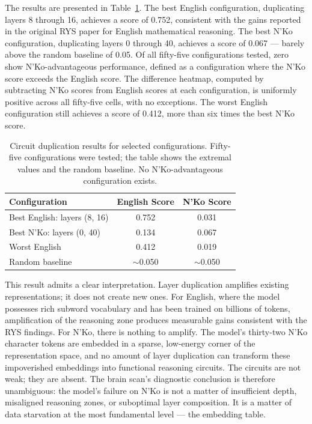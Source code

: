 \documentclass[11pt]{article}
\newcommand{\nko}{N'Ko}
\begin{document}
The results are presented in Table~\ref{tab:circuit_dup}. The best English configuration, duplicating layers 8 through 16, achieves a score of 0.752, consistent with the gains reported in the original RYS paper for English mathematical reasoning. The best \nko{} configuration, duplicating layers 0 through 40, achieves a score of 0.067 --- barely above the random baseline of 0.05. Of all fifty-five configurations tested, zero show \nko{}-advantageous performance, defined as a configuration where the \nko{} score exceeds the English score. The difference heatmap, computed by subtracting \nko{} scores from English scores at each configuration, is uniformly positive across all fifty-five cells, with no exceptions. The worst English configuration still achieves a score of 0.412, more than six times the best \nko{} score.

\begin{table}[ht]
\centering
\caption{Circuit duplication results for selected configurations. Fifty-five configurations were tested; the table shows the extremal values and the random baseline. No \nko{}-advantageous configuration exists.}
\label{tab:circuit_dup}
\begin{tabular}{@{}lcc@{}}
\toprule
Configuration & English Score & \nko{} Score \\
\midrule
Best English: layers (8, 16) & 0.752 & 0.031 \\
Best \nko{}: layers (0, 40) & 0.134 & 0.067 \\
Worst English & 0.412 & 0.019 \\
Random baseline & $\sim$0.050 & $\sim$0.050 \\
\bottomrule
\end{tabular}
\end{table}

This result admits a clear interpretation. Layer duplication amplifies existing representations; it does not create new ones. For English, where the model possesses rich subword vocabulary and has been trained on billions of tokens, amplification of the reasoning zone produces measurable gains consistent with the RYS findings. For \nko{}, there is nothing to amplify. The model's thirty-two \nko{} character tokens are embedded in a sparse, low-energy corner of the representation space, and no amount of layer duplication can transform these impoverished embeddings into functional reasoning circuits. The circuits are not weak; they are absent. The brain scan's diagnostic conclusion is therefore unambiguous: the model's failure on \nko{} is not a matter of insufficient depth, misaligned reasoning zones, or suboptimal layer composition. It is a matter of data starvation at the most fundamental level --- the embedding table.
\end{document}
